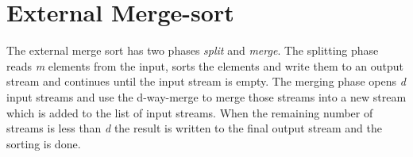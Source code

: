 \section{External Merge-sort}
The external merge sort has two phases \textit{split} and \textit{merge}. The splitting phase reads \textit{m} elements from the input, sorts the elements and write them to an output stream and continues until the input stream is empty. The merging phase opens \textit{d} input streams and use the d-way-merge to merge those streams into a new stream which is added to the list of input streams. When the remaining number of streams is less than \textit{d} the result is written to the final output stream and the sorting is done.

